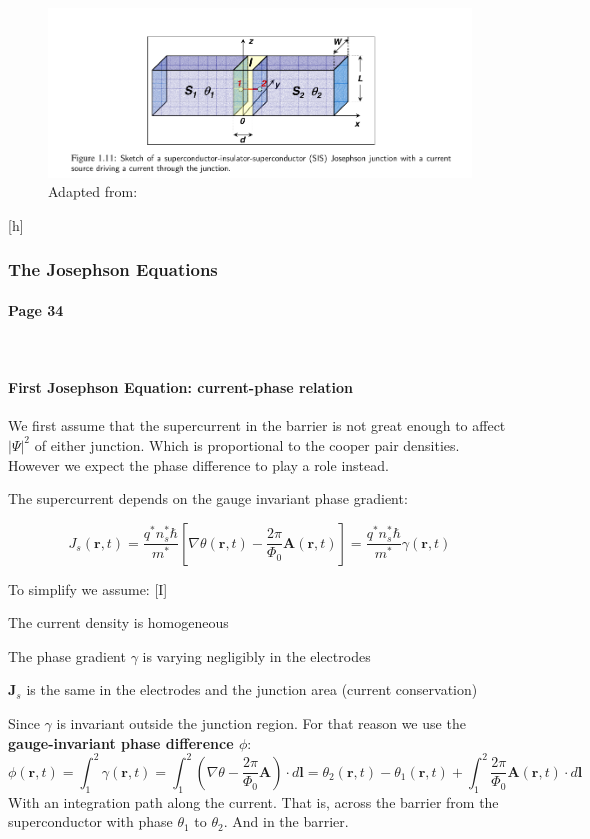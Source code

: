 \documentclass[12pt]{article}
\let\tempthree\enumerate
\let\tempfour\endenumerate
\renewenvironment{enumerate}{\tempthree\setlength{\itemsep}{0pt}}{\tempfour}
\numberwithin{equation}{subsection}
\newcommand\page[1]{
{
\color{blue}\paragraph{
Page #1
}\mbox{}\\
}
}
\begin{document}
\begin{figure}[h]
\includegraphics[scale=1.6]{images/superconductor-junction.png}
\caption{Adapted from: \cite{gross2016applied}}
\end{figure}[h]

\subsubsection{The Josephson Equations}
\page{34}
\paragraph{First Josephson Equation: current-phase relation\\}
We first assume that the supercurrent in the barrier is not great enough to affect $|\Psi|^2$ of either junction. Which is proportional to the cooper pair densities. However we expect the phase difference to play a role instead.

The supercurrent depends on the gauge invariant phase gradient:

\begin{equation}
    J_s(\mathbf r, t) = \frac{q^*n_s^*\hbar}{m^*} \left [ \nabla\theta(\mathbf r, t) - \frac{2\pi}{\Phi_0}\mathbf A (\mathbf r, t)  \right] = \frac{q^*n_s^*\hbar}{m^*} \gamma (\mathbf r, t)
\end{equation}

To simplify we assume:
\begin{enumerate}[I]
    \item The current density is homogeneous
    \item The phase gradient $\gamma$ is varying negligibly in the electrodes
    \item $\mathbf J_s$ is the same in the electrodes and the junction area (current conservation)
\end{enumerate}

Since $\gamma$ is invariant outside the junction region. For that reason we use the \textbf{gauge-invariant phase difference $\phi$}:
\begin{equation}
    \phi(\mathbf r, t) = \int^2_1\gamma (\mathbf r, t) = \int^2_1 \left( \nabla \theta - \frac{2\pi}{\Phi_0}\mathbf A \right ) \cdot d\mathbf l = \theta_2(\mathbf r, t) - \theta_1(\mathbf r, t)  +  \int^2_1  \frac{2\pi}{\Phi_0}\mathbf A(\mathbf r, t) \cdot d\mathbf l
\end{equation}
With an integration path along the current. That is, across the barrier from the superconductor with phase $\theta_1$ to $\theta_2$. And in the barrier.
\end{document}
